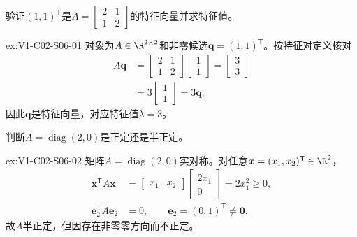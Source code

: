 \begin{SLChapterExercisePairSection}
\begin{exercise}[特征对]\label{ex:V1-C02-S06-01}
验证$(1,1)^{\mathsf T}$是$A=\begin{bmatrix}2&1\\1&2\end{bmatrix}$的特征向量并求特征值。
\end{exercise}
\label{sol:V1-C02-S06-01}
\begin{chapterexercisesolution}{ex:V1-C02-S06-01}
对象为$A\in\R^{2\times2}$和非零候选$\boldsymbol q=(1,1)^{\mathsf T}$。按特征对定义核对
\[
\begin{aligned}
A\boldsymbol q
&=\begin{bmatrix}2&1\\1&2\end{bmatrix}
\begin{bmatrix}1\\1\end{bmatrix}
=\begin{bmatrix}3\\3\end{bmatrix}\\
&=3\begin{bmatrix}1\\1\end{bmatrix}=3\boldsymbol q.
\end{aligned}
\]
因此$\boldsymbol q$是特征向量，对应特征值$\lambda=3$。
\end{chapterexercisesolution}

\begin{exercise}[正定判断]\label{ex:V1-C02-S06-02}
判断$A=\operatorname{diag}(2,0)$是正定还是半正定。
\end{exercise}
\label{sol:V1-C02-S06-02}
\begin{chapterexercisesolution}{ex:V1-C02-S06-02}
矩阵$A=\operatorname{diag}(2,0)$实对称。对任意$\boldsymbol x=(x_1,x_2)^{\mathsf T}\in\R^2$，
\[
\begin{aligned}
\boldsymbol x^{\mathsf T}A\boldsymbol x
&=\begin{bmatrix}x_1&x_2\end{bmatrix}
\begin{bmatrix}2x_1\\0\end{bmatrix}=2x_1^2\ge0,\\
\boldsymbol e_2^{\mathsf T}A\boldsymbol e_2
&=0,\qquad \boldsymbol e_2=(0,1)^{\mathsf T}\ne\boldsymbol0.
\end{aligned}
\]
故$A$半正定，但因存在非零零方向而不正定。
\end{chapterexercisesolution}


\end{SLChapterExercisePairSection}
